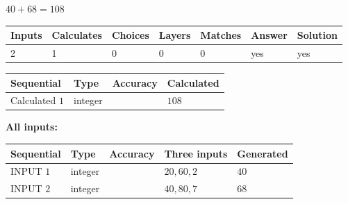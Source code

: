 \documentclass[12pt]{article}
\begin{document}
 
\noindent{}
 
 

$ %
40 +  %
68=   %
108$
 
 
\noindent{}
 
 

 
   
   
   
   
\noindent\begin{tabular}{|l|l|l|l|l|l|l|}
 \hline
Inputs & Calculates & Choices & Layers & Matches & Answer & Solution \\ \hline
 2  & 
 1  & 
 0
  & 
 0  & 
 0  & 
  yes & 
  yes 
  \\ \hline
 \end{tabular}
   
   
   
   
\noindent{}
   
   
  
  
\noindent\begin{tabular}{|l|l|l|l|}
\hline
 Sequential & Type & Accuracy & Calculated \\ 
\hline
 
 
  Calculated $  1 $ & integer &  & 
  $ 108 $ 
 \\  \hline  
 \end{tabular}
   
   
   
   
\noindent\vspace{0.1in}\hspace{-0.08in} {\textbf{\Large{All inputs: }}}
   
   
  
  
\noindent\begin{tabular}{|l|l|l|l|l|}
\hline
 Sequential & Type & Accuracy & Three inputs & Generated \\ 
\hline
 
 
  INPUT $  1 $ & integer &  & $
 20
 , 
 60
 , 
 2
 $ & $ 40 $ 
 \\  \hline  
 
 
  INPUT $  2 $ & integer &  & $
 40
 , 
 80
 , 
 7
 $ & $ 68 $ 
 \\  \hline  
 \end{tabular}
   
   
  
\end{document}
